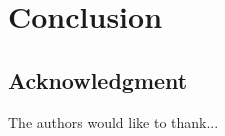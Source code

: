 \documentclass[conference]{IEEEtran}
\begin{document}
\section{Conclusion}\label{chap:conclusion}
\subsection*{Acknowledgment}\label{sec:acknowledgment}
The authors would like to thank...



\end{document}
